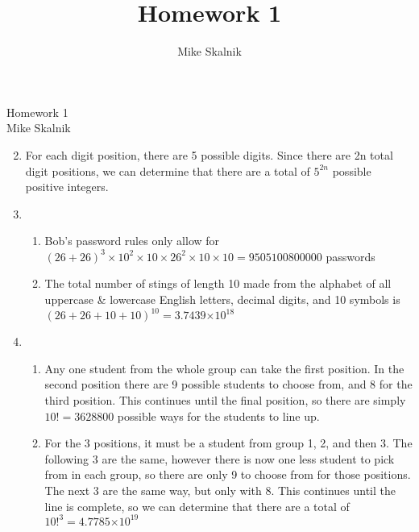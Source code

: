 \documentclass[12pt]{article}
\title{Homework 1}
\author{Mike Skalnik}
\providecommand{\e}[1]{\ensuremath{\times 10^{#1}}}
\begin{document}
\begin{flushright}{\large Homework 1\\ Mike Skalnik}\end{flushright}

\begin{enumerate}
  \setcounter{enumi}{1}
  
  \item
    For each digit position, there are 5 possible digits. Since there are 2n total digit positions, we can determine that there are a total of $5^{2n}$ possible positive integers.
  \item
    \begin{enumerate}
      \item Bob's password rules only allow for
        $\left( 26 + 26 \right)^3 \times 10^2 \times 10 \times 26^2 \times 10 \times 10 = 9505100800000$
        passwords
      \item The total number of stings of length 10 made from the alphabet of all uppercase \& lowercase English letters, decimal digits, and 10 symbols is
        $\left( 26 + 26 + 10 + 10 \right)^{10} = 3.7439\e{18}$
    \end{enumerate}
  
  \setcounter{enumi}{5}
  
  \item
    \begin{enumerate}
      \item Any one student from the whole group can take the first position. In the second position there are 9 possible students to choose from, and 8 for the third position. This continues until the final position, so there are simply $10! = 3628800$ possible ways for the students to line up.
      \item For the 3 positions, it must be a student from group 1, 2, and then 3. The following 3 are the same, however there is now one less student to pick from in each group, so there are only 9 to choose from for those positions. The next 3 are the same way, but only with 8. This continues until the line is complete, so we can determine that there are a total of $10!^3 = 4.7785\e{19}$ 
    \end{enumerate}
  
  \setcounter{enumi}{10}
  

\end{enumerate}
\end{document}
